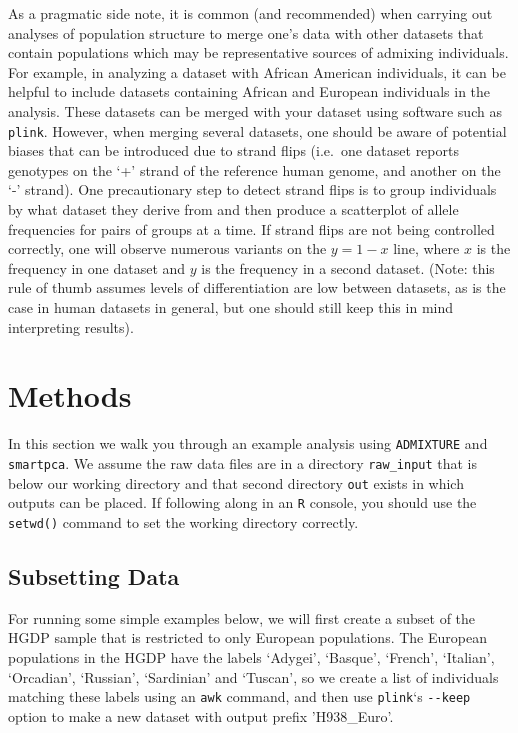 \documentclass[smallextended]{svjour3}       %
\begin{document}
As a pragmatic side note, it is common (and recommended) when carrying
out analyses of population structure to merge one's data with other
datasets that contain populations which may be representative sources of
admixing individuals. For example, in analyzing a dataset with African
American individuals, it can be helpful to include datasets containing
African and European individuals in the analysis. These datasets can be
merged with your dataset using software such as \texttt{plink}. However,
when merging several datasets, one should be aware of potential biases
that can be introduced due to strand flips (i.e.~one dataset reports
genotypes on the `+' strand of the reference human genome, and another
on the `-' strand). One precautionary step to detect strand flips is to
group individuals by what dataset they derive from and then produce a
scatterplot of allele frequencies for pairs of groups at a time. If
strand flips are not being controlled correctly, one will observe
numerous variants on the \(y=1-x\) line, where \(x\) is the frequency in
one dataset and \(y\) is the frequency in a second dataset. (Note: this
rule of thumb assumes levels of differentiation are low between
datasets, as is the case in human datasets in general, but one should
still keep this in mind interpreting results).

\section{Methods}\label{methods}

In this section we walk you through an example analysis using
\texttt{ADMIXTURE} and \texttt{smartpca}. We assume the raw data files
are in a directory \texttt{raw\_input} that is below our working
directory and that second directory \texttt{out} exists in which outputs
can be placed. If following along in an \texttt{R} console, you should
use the \texttt{setwd()} command to set the working directory correctly.

\subsection{Subsetting Data}\label{subsetting-data}

For running some simple examples below, we will first create a subset of
the HGDP sample that is restricted to only European populations. The
European populations in the HGDP have the labels `Adygei', `Basque',
`French', `Italian', `Orcadian', `Russian', `Sardinian' and `Tuscan', so
we create a list of individuals matching these labels using an
\texttt{awk} command, and then use \texttt{plink}`s \texttt{-\/-keep}
option to make a new dataset with output prefix 'H938\_Euro'.
\end{document}
